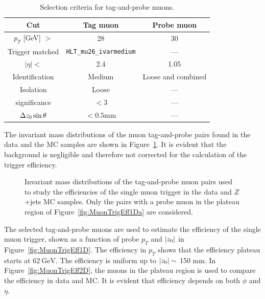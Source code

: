 \begin{table}[!htb]
	\centering
	\begin{tabular}{ccc}
		\hline
		\hline
		Cut & Tag muon & Probe muon \\
		\hline
		$p_{T}$ [GeV] $>$ & 28 & 30 \\
		Trigger matched & \texttt{HLT\_mu26\_ivarmedium} & --- \\
		$|\eta| <$ & 2.4 & 1.05 \\
		Identification & Medium & Loose and combined \\
		Isolation & Loose & --- \\
		\dzero significance & $< 3$ & --- \\
		$\Delta z_{0} \sin{\theta}$ & $< 0.5 \si{\mm}$ & --- \\
		\hline
		\hline
	\end{tabular}
	\caption{Selection criteria for tag-and-probe muons.}
	\label{tab:ZmmSelection}
\end{table}

The invariant mass distributions of the muon tag-and-probe pairs found in the data and the MC samples are shown in Figure~\ref{fig:MuonTrigMass}. It is evident that the background is negligible and therefore not corrected for the calculation of the trigger efficiency.

\begin{figure}[!htb]
    \centering
    \caption{Invariant mass distributions of the tag-and-probe muon pairs used to study the efficiencies of the single muon trigger in the data and $Z$+jets MC samples. Only the pairs with a probe muon in the plateau region of Figure~\ref{fig:MuonTrigEff1Da} are considered.
    }
    \label{fig:MuonTrigMass}
\end{figure}

The selected tag-and-probe muons are used to estimate the efficiency of the single muon trigger, shown as a function of probe $p_{T}$ and $|z_{0}|$ in Figure~\ref{fig:MuonTrigEff1D}. The efficiency in $p_{T}$ shows that the efficiency plateau starts at $62~\si{\GeV}$. The efficiency is uniform up to $|z_{0}|\sim$ 150 mm. In Figure~\ref{fig:MuonTrigEff2D}, the muons in the plateau region is used to compare the efficiency in data and MC. It is evident that efficiency depends on both $\phi$ and $\eta$. 

